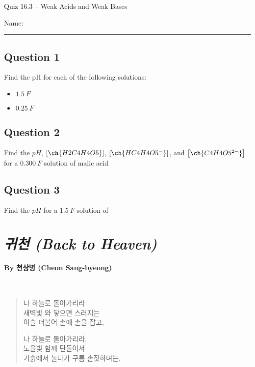 \documentclass[11pt, letterpaper]{memoir}
\begin{document}
	\begin{center}
		{\large	Quiz 16.3 -- Weak Acids and Weak Bases}
	\end{center}
	{\large Name: \rule[-1mm]{4in}{.1pt} 
	
	
	\subsection*{Question 1}
	Find the pH for each of the following solutions:
	\begin{itemize}
		\item $1.5~F$ 
		
		\vspace{6em}
		\item $0.25~F$ 		
	\end{itemize}
	
	\vspace{6em}
	\subsection*{Question 2}
	Find the $pH$, $\left[\ch{H2C4H4O5}\right]$, $\left[\ch{HC4H4O5^-}\right]$, and  $\left[\ch{C4H4O5^{2-}}\right]$ for a $0.300~F$ solution of malic acid
	
	\vspace{14em}
	\subsection*{Question 3}
	Find the $pH$ for a $1.5~F$ solution of 
	\newpage
	\pagestyle{empty}
	\addtocounter{page}{-1}
	\section*{\emph{{귀천} (Back to Heaven)}}
	\paragraph{By {천상병} (Cheon Sang-byeong)}~
	
	{
		\begin{verse}
			나 하늘로 돌아가리라\\
			새벽빛 와 닿으면 스러지는\\
			이슬 더불어 손에 손을 잡고,
			
			나 하늘로 돌아가리라.\\
			노을빛 함께 단둘이서\\
			기슭에서 놀다가 구름 손짓하며는,
			

\end{verse}}}
\end{document}
